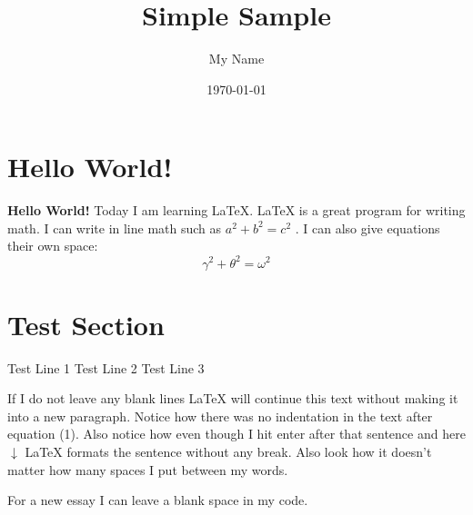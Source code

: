 \documentclass{article} %
\title{Simple Sample} %
\author{My Name} %
\date{\today} %
\begin{document}
\maketitle %

\section{Hello World!} %

\textbf{Hello World!} Today I am learning \LaTeX. %
\LaTeX{} is a great program for writing math. I can write in line math such as $a^2+b^2=c^2$ %
. I can also give equations their own space:
\begin{equation} %
  \gamma^2+\theta^2=\omega^2
\end{equation}

\section{Test Section} 
Test Line 1 
Test Line 2
Test Line 3

If I do not leave any blank lines \LaTeX{} will continue  this text without making it into a new paragraph.  Notice how there was no indentation in the text after equation (1).
Also notice how even though I hit enter after that sentence and here $\downarrow$
\LaTeX{} formats the sentence without any break.  Also   look  how      it   doesn't     matter          how    many  spaces     I put     between       my    words.

For a new essay I can leave a blank space in my code.
\end{document}
